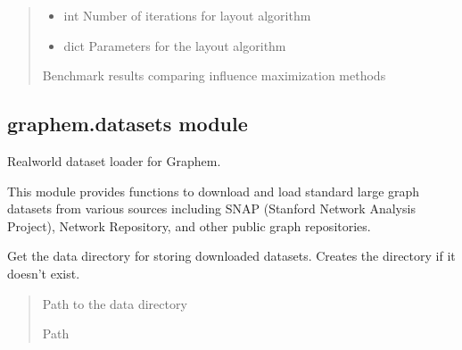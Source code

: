 \documentclass[letterpaper,10pt,english]{sphinxmanual}
\begin{document}
\begin{fulllineitems}
\begin{quote}
\begin{description}
\begin{itemize}
\item {} 
\sphinxAtStartPar
{} \textendash{} int
Number of iterations for layout algorithm

\item {} 
\sphinxAtStartPar
{} \textendash{} dict
Parameters for the layout algorithm

\end{itemize}

\sphinxAtStartPar
Benchmark results comparing influence maximization methods

\sphinxAtStartPar
{}

\end{description}\end{quote}

\end{fulllineitems}



\subsection{graphem.datasets module}
\label{\detokenize{graphem:module-graphem.datasets}}\label{\detokenize{graphem:graphem-datasets-module}}
\sphinxAtStartPar
Real\sphinxhyphen{}world dataset loader for Graphem.

\sphinxAtStartPar
This module provides functions to download and load standard large graph datasets
from various sources including SNAP (Stanford Network Analysis Project),
Network Repository, and other public graph repositories.

\begin{fulllineitems}
\label{\detokenize{graphem:graphem.datasets.get_data_directory}}
\pysigstartsignatures
{}
\pysigstopsignatures
\sphinxAtStartPar
Get the data directory for storing downloaded datasets.
Creates the directory if it doesn’t exist.
\begin{quote}\begin{description}
\sphinxAtStartPar
Path to the data directory

\sphinxAtStartPar
Path

\end{description}\end{quote}

\end{fulllineitems}
\end{document}

